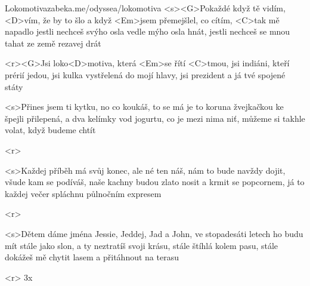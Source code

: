 \begin{song}[Poletíme?]{5}{Lokomotiva}{zabeka.me/odyssea/lokomotiva}
<s><G>Pokaždé když tě vidím, <D>vím, že by to šlo 
a když <Em>jsem přemejšlel, co cítím, <C>tak mě napadlo 
jestli nechceš svýho osla vedle mýho osla hnát, 
jestli nechceš se mnou tahat ze země rezavej drát 

<r><G>Jsi loko<D>motiva, která <Em>se řítí <C>tmou, 
jsi indiáni, kteří prérií jedou, 
jsi kulka vystřelená do mojí hlavy,
jsi prezident a já tvé spojené státy 

<s>Přines jsem ti kytku, no co koukáš, to se má 
je to koruna žvejkačkou ke špejli přilepená, 
a dva kelímky vod jogurtu, co je mezi nima niť, 
můžeme si takhle volat, když budeme chtít 

<r>

<s>Každej příběh má svůj konec, ale né ten náš, 
nám to bude navždy dojit, všude kam se podíváš, 
naše kachny budou zlato nosit a krmit se popcornem, 
já to každej večer spláchnu půlnočním expresem 

<r>

<s>Dětem dáme jména Jessie, Jeddej, Jad a John, 
ve stopadesáti letech ho budu mít stále jako slon, 
a ty neztratíš svoji krásu, stále štíhlá kolem pasu, 
stále dokážeš mě chytit lasem a přitáhnout na terasu 

<r>
3x 

\end{song}

